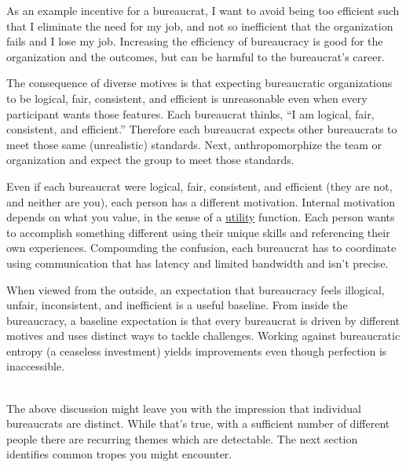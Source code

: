 As an example incentive for a bureaucrat, I want to avoid being too efficient such that I eliminate the need for my job, 
and not so inefficient that the organization fails and I lose my job. Increasing the efficiency of bureaucracy is good for the organization and the outcomes, but can be harmful to the bureaucrat's career.


The consequence of diverse motives is that expecting bureaucratic organizations to be logical, fair, consistent, and efficient is unreasonable even when every participant wants those features. Each bureaucrat thinks, ``I am logical, fair, consistent, and efficient.'' Therefore each bureaucrat expects other bureaucrats to meet those same (unrealistic) standards. Next, anthropomorphize the team or organization and expect the group to meet those standards. 

Even if each bureaucrat were logical, fair, consistent, and efficient (they are not, and neither are you), each person has a different motivation. Internal motivation depends on what you value, in the sense of a
\href{https://en.wikipedia.org/wiki/Utility}{utility}
function.  Each person wants to accomplish something different using their unique skills and referencing their own experiences. Compounding the confusion, each bureaucrat has to coordinate using communication that has latency and limited bandwidth and isn't precise.

When viewed from the outside, an expectation that bureaucracy feels illogical, unfair, inconsistent, and inefficient is a useful baseline. From inside the bureaucracy, a baseline expectation is that every bureaucrat is driven by different motives and uses distinct ways to tackle challenges. Working against bureaucratic entropy (a ceaseless investment) yields improvements even though perfection is inaccessible.


\ \\


The above discussion might leave you with the impression that individual bureaucrats are distinct. While that's true, with a sufficient number of different people there are recurring themes which are detectable. The next section identifies common tropes you might encounter.